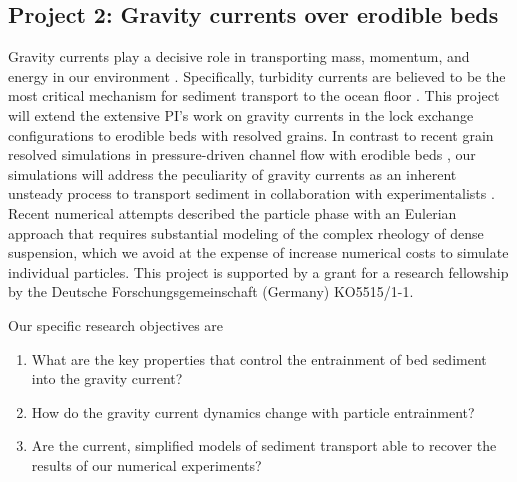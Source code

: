 \documentclass[10pt]{article}
\begin{document}
\subsection*{Project 2:  Gravity currents over erodible beds}
Gravity currents play a decisive role in transporting mass, momentum, and energy in our environment \citep{simpson1997gravity}. Specifically, turbidity currents are believed to be the most critical mechanism for sediment transport to the ocean floor \citep{kneller2016long}. This project will extend the extensive PI's work on gravity currents\citep{meiburg2010, konopliv2016modelling} in the lock exchange configurations to erodible beds with resolved grains. In contrast to recent grain resolved simulations in pressure-driven channel flow with erodible beds \citep{vowinckel2016b,kidanemariam2017formation}, our simulations will address the peculiarity of gravity currents as an inherent unsteady process to transport sediment in collaboration  with experimentalists \citep{zordan2018}. Recent numerical attempts \citep{kyrousi2018} described the particle phase with an Eulerian approach that requires substantial modeling of the complex rheology of dense suspension, which we avoid at the expense of increase numerical costs to simulate individual particles. This project is supported by a grant for a research fellowship by the Deutsche Forschungsgemeinschaft (Germany) KO5515/1-1.

 Our specific research objectives are
\begin{enumerate}
\item What are the key properties that control the entrainment of bed sediment into the gravity current?
\item How do the gravity current dynamics change with particle entrainment?
\item Are the current, simplified models of sediment transport able to recover the results of our numerical experiments?
\end{enumerate} 
\end{document}
